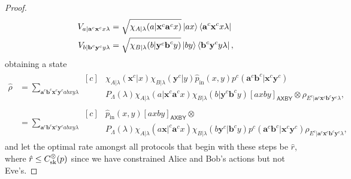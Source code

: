 \documentclass[10pt, a4paper]{article}
\numberwithin{equation}{section} %
\theoremstyle{definition}
\theoremstyle{plain}
\newcommand{\?}{\mathrel{?}} %
\newcommand{\cvec}[1]{\boldsymbol{\mathbf{#1}}}    %
\newcommand{\crv}[1]{\mathsf{#1}}
\newcommand{\proj}[2][]{{[#2]}_{#1}}
\newcommand{\prin}[1][p]{#1_{\mathrm{in}}}
\newcommand{\sk}{\rm sk}
\begin{document}
\begin{proof}
\begin{align*}
                   V_{a|\cvec{a}^c\cvec{x}^c x\lambda} &= \sqrt{\chi_{A|\lambda}(a|\cvec{x}^c\cvec{a}^cx)} \ket{ax}\bra{\cvec{a}^c\cvec{x}^c x\lambda} \\
                   V_{b|\cvec{b}^c\cvec{y}^c y\lambda} &= \sqrt{\chi_{B|\lambda}(b|\cvec{y}^c\cvec{b}^cy)} \ket{by}\bra{\cvec{b}^c\cvec{y}^c y\lambda},
                 \end{align*}
                 obtaining a state
                 \begin{align*}
                   \hat{\rho} &= \sum_{\cvec{a}^c\cvec{b}^c \cvec{x}^c\cvec{y}^c abxy\lambda} \begin{aligned}[c]
          & \chi_{A|\lambda}(\cvec{x}^c|x) \chi_{B|\lambda}(\cvec{y}^c|y) \prin[\hat{p}](x,y) p^c(\cvec{a}^c\cvec{b}^c|\cvec{x}^c\cvec{y}^c) \\
          & P_{\Lambda}(\lambda) \chi_{A|\lambda}(a|\cvec{x}^c\cvec{a}^cx) \chi_{B|\lambda}(b|\cvec{y}^c\cvec{b}^cy) \proj[\crv{AXBY}]{axby} \otimes \rho_{E^c|\cvec{a}^c\cvec{x}^c \cvec{b}^c\cvec{y}^c\lambda},
                   \end{aligned} \\
                              &= \sum_{\cvec{a}^c\cvec{b}^c \cvec{x}^c\cvec{y}^c abxy\lambda} \begin{aligned}[c]
          & \prin[\hat{p}](x,y) \proj[\crv{AXBY}]{axby} \otimes \\
          & P_{\Lambda}(\lambda)  \chi_{A|\lambda}(a\cvec{x}|^c\cvec{a}^cx) \chi_{B|\lambda}(b\cvec{y}^c|\cvec{b}^cy) p^c(\cvec{a}^c\cvec{b}^c|\cvec{x}^c\cvec{y}^c) \rho_{E^c|\cvec{a}^c\cvec{x}^c \cvec{b}^c\cvec{y}^c\lambda},
                   \end{aligned}
                 \end{align*}
                 and let the optimal rate amongst all protocols that begin with these steps be \(\hat{r}\), where \(\hat{r} \leq C_{\sk}^{\otimes}(p)\) since we have constrained Alice and Bob's actions but not Eve's.


\end{proof}
\end{document}
